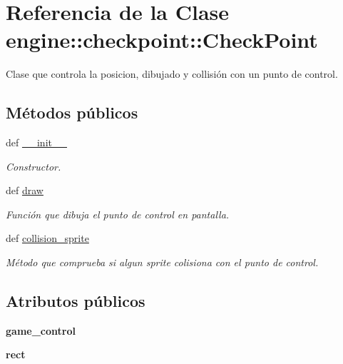 \hypertarget{classengine_1_1checkpoint_1_1CheckPoint}{
\section{\-Referencia de la \-Clase engine\-:\-:checkpoint\-:\-:\-Check\-Point}
\label{classengine_1_1checkpoint_1_1CheckPoint}
}


\-Clase que controla la posicion, dibujado y collisión con un punto de control.  


\subsection*{\-Métodos públicos}
\begin{DoxyCompactItemize}
\item 
def \hyperlink{classengine_1_1checkpoint_1_1CheckPoint_a6053652137906757e7276bdb57631e4a}{\-\_\-\-\_\-init\-\_\-\-\_\-}
\begin{DoxyCompactList}\small\item\em \-Constructor. \end{DoxyCompactList}\item 
def \hyperlink{classengine_1_1checkpoint_1_1CheckPoint_a9eb334494846aba7b4f681672b5a0826}{draw}
\begin{DoxyCompactList}\small\item\em \-Función que dibuja el punto de control en pantalla. \end{DoxyCompactList}\item 
def \hyperlink{classengine_1_1checkpoint_1_1CheckPoint_ac76a78c4f78ddbf705c7d8d6846a8287}{collision\-\_\-sprite}
\begin{DoxyCompactList}\small\item\em \-Método que comprueba si algun sprite colisiona con el punto de control. \end{DoxyCompactList}\end{DoxyCompactItemize}
\subsection*{\-Atributos públicos}
\begin{DoxyCompactItemize}
\item 
\hypertarget{classengine_1_1checkpoint_1_1CheckPoint_aca1aa89e49ca8bb364c68ea4d84cc24d}{
{\bfseries game\-\_\-control}}
\label{classengine_1_1checkpoint_1_1CheckPoint_aca1aa89e49ca8bb364c68ea4d84cc24d}

\item 
\hypertarget{classengine_1_1checkpoint_1_1CheckPoint_a9d67dce5fea86824afa90a7ec40dc548}{
{\bfseries rect}}
\label{classengine_1_1checkpoint_1_1CheckPoint_a9d67dce5fea86824afa90a7ec40dc548}

\end{DoxyCompactItemize}


